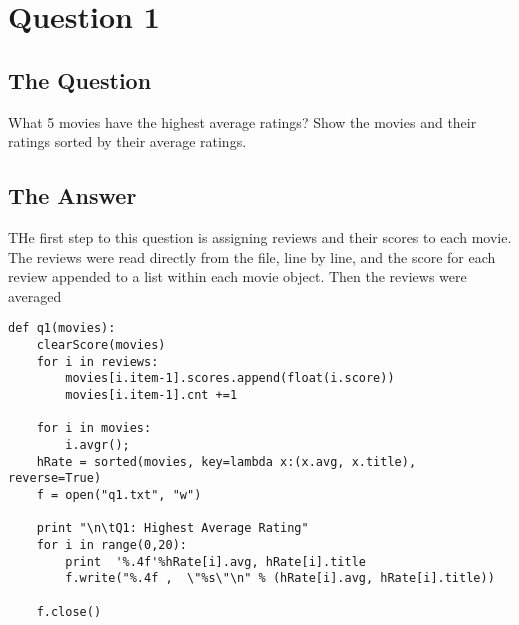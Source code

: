 \section{Question 1}

\subsection{The Question}

\begin{flushleft}

What 5 movies have the highest average ratings? Show the movies
and their ratings sorted by their average ratings.

\end{flushleft}
\subsection{The Answer}

THe first step to this question is assigning reviews and their scores to each movie. The reviews were read directly from the file, line by line, and the score for each review appended to a list within each movie object. Then the reviews were averaged
\begin{lstlisting}[caption={Python code for question 1}]
def q1(movies):
	clearScore(movies)
	for i in reviews:
		movies[i.item-1].scores.append(float(i.score))
		movies[i.item-1].cnt +=1

	for i in movies:
		i.avgr(); 
	hRate = sorted(movies, key=lambda x:(x.avg, x.title), reverse=True)
	f = open("q1.txt", "w")
	
	print "\n\tQ1: Highest Average Rating"
	for i in range(0,20):
		print  '%.4f'%hRate[i].avg, hRate[i].title
		f.write("%.4f ,  \"%s\"\n" % (hRate[i].avg, hRate[i].title))

	f.close()

\end{lstlisting}

